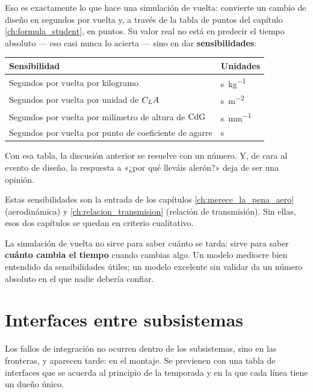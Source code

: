 Eso es exactamente lo que hace una simulación de vuelta: convierte un cambio de
diseño en segundos por vuelta y, a través de la tabla de puntos del capítulo
\ref{ch:formula_student}, en puntos. Su valor real no está en predecir el tiempo
absoluto --- eso casi nunca lo acierta --- sino en dar \textbf{sensibilidades}:

\begin{center}
\begin{tabular}{@{}ll@{}}
\toprule
\textbf{Sensibilidad} & \textbf{Unidades} \\
\midrule
Segundos por vuelta por kilogramo & \si{\second\per\kilogram} \\
Segundos por vuelta por unidad de $C_L A$ & \si{\second\per\meter\squared} \\
Segundos por vuelta por milímetro de altura de $\mathrm{CdG}$ & \si{\second\per\milli\meter} \\
Segundos por vuelta por punto de coeficiente de agarre & \si{\second} \\
\bottomrule
\end{tabular}
\end{center}

Con esa tabla, la discusión anterior se resuelve con un número. Y, de cara al
evento de diseño, la respuesta a «¿por qué lleváis alerón?» deja de ser una
opinión.

Estas sensibilidades son la entrada de los capítulos
\ref{ch:merece_la_pena_aero} (aerodinámica) y \ref{ch:relacion_transmision}
(relación de transmisión). Sin ellas, esos dos capítulos se quedan en criterio
cualitativo.

\begin{clave}
La simulación de vuelta no sirve para saber cuánto se tarda: sirve para saber
\textbf{cuánto cambia el tiempo} cuando cambias algo. Un modelo mediocre bien
entendido da sensibilidades útiles; un modelo excelente sin validar da un número
absoluto en el que nadie debería confiar.
\end{clave}

\section{Interfaces entre subsistemas}
\label{sec:coche_como_sistema:05}

Los fallos de integración no ocurren dentro de los subsistemas, sino en las
fronteras, y aparecen tarde: en el montaje. Se previenen con una tabla de
interfaces que se acuerda al principio de la temporada y en la que cada línea
tiene un dueño único.

